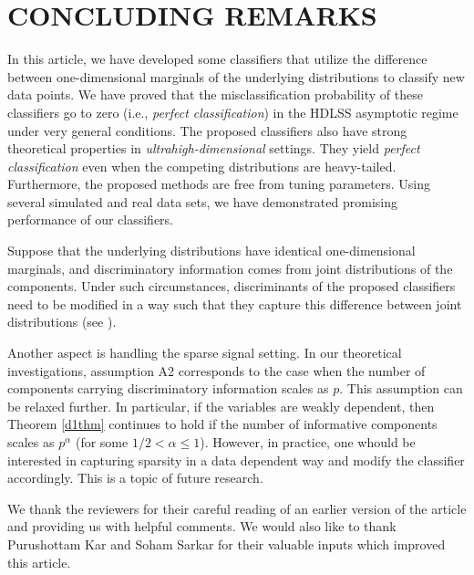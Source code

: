 \documentclass[twoside]{article}
\newcommand{\0}{\mathbf{0}}
\newcommand{\1}{\mathbf{1}}
\numberwithin{equation}{section}
\begin{document}
\section{CONCLUDING REMARKS}\label{conclude}
In this article, we have developed some classifiers that utilize the difference between one-dimensional marginals of the underlying distributions to classify new data points. We have proved that the misclassification probability of these classifiers go to zero (i.e., {\it perfect classification}) in the HDLSS asymptotic regime under very general conditions. The proposed classifiers also have strong theoretical properties in  \emph{ultrahigh-dimensional} settings. They yield {\it perfect classification} even when the competing distributions are heavy-tailed. Furthermore, the proposed methods are free from tuning parameters. Using several simulated and real data sets, we have demonstrated promising performance of our classifiers.

Suppose that the underlying distributions have identical one-dimensional marginals, and discriminatory information comes from joint distributions of the components. Under such circumstances, discriminants of the proposed classifiers need to be modified in a way such that they capture this difference between joint distributions (see \cite{roy2022generalizations}). 

Another aspect is handling the sparse signal setting. In our theoretical investigations, assumption A2 corresponds to the case when the number of components carrying discriminatory information scales as $p$. This assumption can be relaxed further. In particular, if the variables are weakly dependent, then Theorem \ref{d1thm} continues to hold if the number of informative components scales as $p^\alpha$ (for some $1/2<\alpha\le 1$). However, in practice, one whould be interested in capturing sparsity in a data dependent way and modify the classifier accordingly. This is a topic of future research. %

\acknowledgments

We thank the reviewers for their careful reading of an earlier version of the article and providing us with helpful comments. We would also like to thank Purushottam Kar and Soham Sarkar for their valuable inputs which improved this article.
\end{document}
